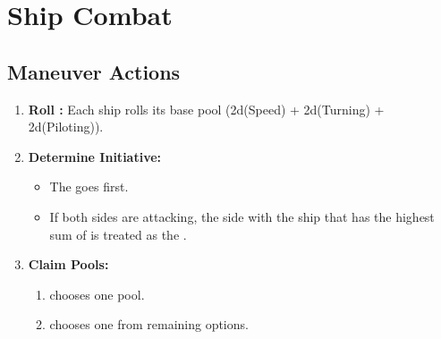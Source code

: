 \section{Ship Combat}

\subsection{Maneuver Actions}

\begin{enumerate}
    \item \textbf{Roll \dicetype{\maneuver}:} Each ship rolls its base \dicetype{\maneuver} pool (2d(Speed) + 2d(Turning) + 2d(Piloting)).
    
    \item \textbf{Determine Initiative:} 
    \begin{itemize}
        \item The \attackingside{} goes first.
        \item If both sides are attacking, the side with the ship that has the highest sum of \dicetype{\maneuver} is treated as the \attackingside.
    \end{itemize}

    \item \textbf{Claim \dicetype{\environmental} Pools:}
    \begin{enumerate}
        \item \attackingside{} chooses one \dicetype{\environmental} pool.
        \item {} chooses one from remaining options.
    \end{enumerate}


\end{enumerate}
